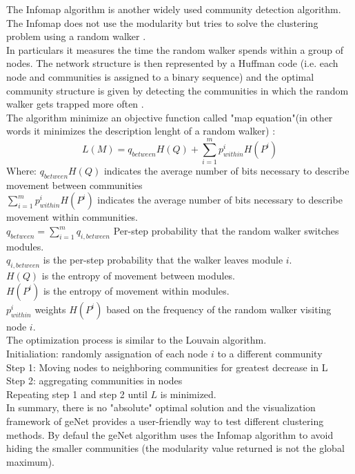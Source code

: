 \documentclass{article}
\begin{document}
The Infomap algorithm is another widely used community detection algorithm. The Infomap does not use the modularity but tries to solve the clustering problem using a random walker \cite{Linhares2020}.\\
In particulars it measures the time the random walker spends within a group of nodes. The network structure is then represented by a Huffman code (i.e. each node and communities is assigned to a binary sequence) and the optimal community structure is given by detecting the communities in which the random walker gets trapped more often \cite{Linhares2020}.\\
The algorithm minimize an objective function called "map equation"(in other words it minimizes the description lenght of a random walker) \cite{Linhares2020}:\\
\begin{equation}
L(M)=q_{between}H(Q) + \sum\limits_{i=1}^m p_{within}^{i}H(P^{i})
\end{equation}
Where:
$q_{between}H(Q)$ indicates the average number of bits necessary to describe movement between communities\\
$\sum\limits_{i=1}^m p_{within}^{i}H(P^{i})$ indicates the average number of bits necessary to describe movement within communities.\\
$q_{between}=\sum\limits_{i=1}^m q_{i,between}$ Per-step probability that the random walker switches modules.\\ 
$q_{i,between}$ is the per-step probability that the walker leaves module $i$.\\
$H(Q)$ is the entropy of movement between modules.\\
$H(P^{i})$ is the entropy of movement within modules.\\
$p_{within}^{i}$ weights $H(P^{i})$ based on the frequency of the random walker visiting node $i$.\\
The optimization process is similar to the Louvain algorithm.\\
Initialiation: randomly assignation of each node $i$ to a different community\\
Step 1: Moving nodes to neighboring communities for greatest decrease in L\\
Step 2: aggregating communities in nodes\\
Repeating step 1 and step 2 until $L$ is minimized.\\
In summary, there is no "absolute" optimal solution and the visualization framework of geNet provides a user-friendly way to test different clustering methods. By defaul the geNet algorithm uses the Infomap algorithm to avoid hiding the smaller communities (the modularity value returned is not the global maximum).\\
\end{document}
